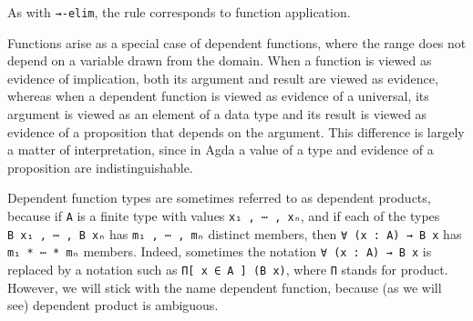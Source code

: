 \begin{fence}
\begin{code}%
\>[0]\AgdaSpace{}%
\AgdaSymbol{:}\AgdaSpace{}%
\AgdaSpace{}%
\AgdaSymbol{\{}\AgdaSpace{}%
\AgdaSymbol{:}\AgdaSpace{}%
\AgdaSymbol{\}}\AgdaSpace{}%
\AgdaSymbol{\{}\AgdaSpace{}%
\AgdaSymbol{:}\AgdaSpace{}%
\AgdaSpace{}%
\AgdaSpace{}%
\AgdaSymbol{\}}\<%
\\
\>[0][@{}l@{\AgdaIndent{0}}]%
\>[2]\AgdaSpace{}%
\AgdaSymbol{(}\AgdaSpace{}%
\AgdaSymbol{:}\AgdaSpace{}%
\AgdaSpace{}%
\AgdaSymbol{(}\AgdaSpace{}%
\AgdaSymbol{:}\AgdaSpace{}%
\AgdaSymbol{)}\AgdaSpace{}%
\AgdaSpace{}%
\AgdaSpace{}%
\AgdaSymbol{)}\<%
\\
%
\>[2]%
\>[61I]\AgdaSymbol{(}\AgdaSpace{}%
\AgdaSymbol{:}\AgdaSpace{}%
\AgdaSymbol{)}\<%
\\
\>[.][@{}l@{}]\<[61I]%
\>[4]\AgdaComment{-----------------}\<%
\\
%
\>[2]\AgdaSpace{}%
\AgdaSpace{}%
\<%
\\
\>[0]\AgdaSpace{}%
\AgdaSpace{}%
\AgdaSpace{}%
\AgdaSymbol{=}\AgdaSpace{}%
\AgdaSpace{}%
\<%
\end{code}
\end{fence}

As with \texttt{→-elim}, the rule corresponds to function application.

Functions arise as a special case of dependent functions, where the
range does not depend on a variable drawn from the domain. When a
function is viewed as evidence of implication, both its argument and
result are viewed as evidence, whereas when a dependent function is
viewed as evidence of a universal, its argument is viewed as an element
of a data type and its result is viewed as evidence of a proposition
that depends on the argument. This difference is largely a matter of
interpretation, since in Agda a value of a type and evidence of a
proposition are indistinguishable.

Dependent function types are sometimes referred to as dependent
products, because if \texttt{A} is a finite type with values
\texttt{x₁\ ,\ ⋯\ ,\ xₙ}, and if each of the types
\texttt{B\ x₁\ ,\ ⋯\ ,\ B\ xₙ} has \texttt{m₁\ ,\ ⋯\ ,\ mₙ} distinct
members, then \texttt{∀\ (x\ :\ A)\ →\ B\ x} has
\texttt{m₁\ *\ ⋯\ *\ mₙ} members. Indeed, sometimes the notation
\texttt{∀\ (x\ :\ A)\ →\ B\ x} is replaced by a notation such as
\texttt{Π{[}\ x\ ∈\ A\ {]}\ (B\ x)}, where \texttt{Π} stands for
product. However, we will stick with the name dependent function,
because (as we will see) dependent product is ambiguous.

